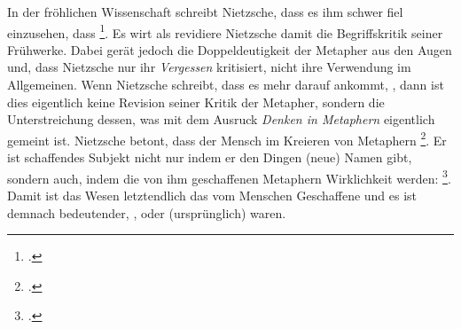 \documentclass[12pt, a4paper, openany]{report}
\begin{document}
In der fröhlichen Wissenschaft schreibt Nietzsche, dass es ihm schwer fiel einzusehen, dass \footcite[][§ 58. S. 422.]{nietzsche_morgenrote_1999}.
Es wirt als revidiere Nietzsche damit die Begriffskritik seiner Frühwerke.
Dabei gerät jedoch die Doppeldeutigkeit der Metapher aus den Augen und, dass Nietzsche nur ihr \emph{Vergessen} kritisiert, nicht ihre Verwendung im Allgemeinen. 
Wenn Nietzsche schreibt, dass es mehr darauf ankommt, , dann ist dies eigentlich keine Revision seiner Kritik der Metapher, sondern die Unterstreichung dessen, was mit dem Ausruck \emph{Denken in Metaphern} eigentlich gemeint ist.
Nietzsche betont, dass der Mensch im Kreieren von Metaphern \footcite[][883]{nietzsche_geburt_1999}.
Er ist schaffendes Subjekt nicht nur indem er den Dingen (neue) Namen gibt, sondern auch, indem die von ihm geschaffenen Metaphern Wirklichkeit werden: 
\footcite[][§ 58, S. 422]{nietzsche_morgenrote_1999}.
Damit ist das Wesen letztendlich das vom Menschen Geschaffene und es ist demnach bedeutender, , oder (ursprünglich) waren.
\end{document}

